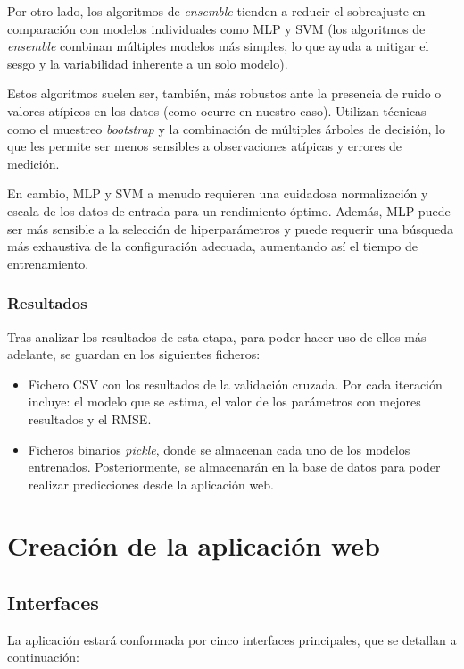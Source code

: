 Por otro lado, los algoritmos de \textit{ensemble} tienden a reducir el sobreajuste en comparación con modelos individuales como MLP y SVM (los algoritmos de \textit{ensemble} combinan múltiples modelos más simples, lo que ayuda a mitigar el sesgo y la variabilidad inherente a un solo modelo).

Estos algoritmos suelen ser, también, más robustos ante la presencia de ruido o valores atípicos en los datos (como ocurre en nuestro caso). Utilizan técnicas como el muestreo \textit{bootstrap} y la combinación de múltiples árboles de decisión, lo que les permite ser menos sensibles a observaciones atípicas y errores de medición.

En cambio, MLP y SVM a menudo requieren una cuidadosa normalización y escala de los datos de entrada para un rendimiento óptimo. Además, MLP puede ser más sensible a la selección de hiperparámetros y puede requerir una búsqueda más exhaustiva de la configuración adecuada, aumentando así el tiempo de entrenamiento.

\subsubsection{Resultados}
Tras analizar los resultados de esta etapa, para poder hacer uso de ellos más adelante, se guardan en los siguientes ficheros:
\begin{itemize}
    \item Fichero CSV con los resultados de la validación cruzada. Por cada iteración incluye: el modelo que se estima, el valor de los parámetros con mejores resultados y el RMSE.
    \item Ficheros binarios \textit{pickle}, donde se almacenan cada uno de los modelos entrenados. Posteriormente, se almacenarán en la base de datos para poder realizar predicciones desde la aplicación web.
\end{itemize}


\section{Creación de la aplicación web}

\subsection{Interfaces}
La aplicación estará conformada por cinco interfaces principales, que se detallan a continuación:

